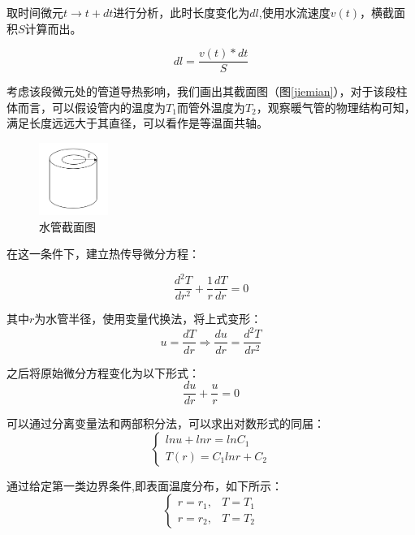 \documentclass{my_paper}
\begin{document}
取时间微元$ t\to t+dt $进行分析，此时长度变化为$dl$,使用水流速度$v(t)$，横截面积$S$计算而出。

\begin{equation}
    dl = \frac{v(t)*dt}{S}
\end{equation}

考虑该段微元处的管道导热影响，我们画出其截面图（图\ref{jiemian}），对于该段柱体而言，可以假设管内的温度为$T_1$而管外温度为$T_2$，观察暖气管的物理结构可知，满足长度远远大于其直径，可以看作是等温面共轴。

\begin {figure}[h]
\centering %
\includegraphics[width=0.2\textwidth]{zhu.png}
\caption{水管截面图} %
\label{five}
\end {figure}
在这一条件下，建立热传导微分方程：

\begin{equation}
\frac{d^{2}T}{dr^{2}} + \frac{1}{r}\frac{dT}{dr}=0
\end{equation}

其中$r$为水管半径，使用变量代换法，将上式变形：
\begin{equation}
u = \frac{dT}{dr} \Rightarrow  \frac{du}{dr}=\frac{d^2T}{dr^2}
\label{}
\end{equation}

之后将原始微分方程变化为以下形式：
\begin{equation}
\frac{du}{dr}+\frac{u}{r} = 0
\label{}
\end{equation}

可以通过分离变量法和两部积分法，可以求出对数形式的同届：
\begin{equation}
    \begin{cases}
        ln u +lnr = lnC_1\\
        T(r) = C_1 lnr + C_2
    \end{cases}
\label{}
\end{equation}

通过给定第一类边界条件\cite{1},即表面温度分布，如下所示：
\begin{equation}
    \begin{cases}
        r = r_1 , & T = T_1\\
        r = r_2 , & T = T_2
    \end{cases}
\end{equation}
\end{document}
